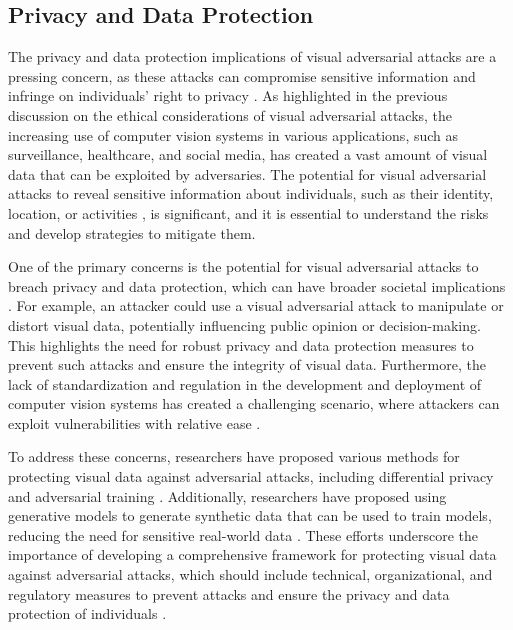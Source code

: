\documentclass[11pt]{article}
\begin{document}
\subsection{Privacy and Data Protection}

The privacy and data protection implications of visual adversarial attacks are a pressing concern, as these attacks can compromise sensitive information and infringe on individuals' right to privacy \cite{ref155}. As highlighted in the previous discussion on the ethical considerations of visual adversarial attacks, the increasing use of computer vision systems in various applications, such as surveillance, healthcare, and social media, has created a vast amount of visual data that can be exploited by adversaries. The potential for visual adversarial attacks to reveal sensitive information about individuals, such as their identity, location, or activities \cite{ref165}, is significant, and it is essential to understand the risks and develop strategies to mitigate them.

One of the primary concerns is the potential for visual adversarial attacks to breach privacy and data protection, which can have broader societal implications \cite{ref153}. For example, an attacker could use a visual adversarial attack to manipulate or distort visual data, potentially influencing public opinion or decision-making. This highlights the need for robust privacy and data protection measures to prevent such attacks and ensure the integrity of visual data. Furthermore, the lack of standardization and regulation in the development and deployment of computer vision systems has created a challenging scenario, where attackers can exploit vulnerabilities with relative ease \cite{ref166}.

To address these concerns, researchers have proposed various methods for protecting visual data against adversarial attacks, including differential privacy \cite{ref167} and adversarial training \cite{ref168}. Additionally, researchers have proposed using generative models to generate synthetic data that can be used to train models, reducing the need for sensitive real-world data \cite{ref169}. These efforts underscore the importance of developing a comprehensive framework for protecting visual data against adversarial attacks, which should include technical, organizational, and regulatory measures to prevent attacks and ensure the privacy and data protection of individuals \cite{ref170}.
\end{document}
